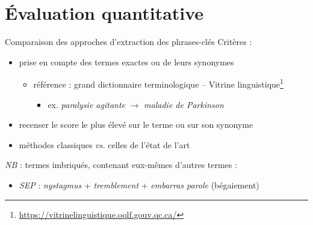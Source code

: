 \documentclass[xcolor={table,usenames,dvipsnames}]{beamer}
\let\olditem\item
\renewcommand{\item}{%
\olditem\vspace{0pt}}
\begin{document}
\section[Évaluation quantitative]{Évaluation quantitative}
\begin{frame}{Comparaison des approches d'extraction des phrases-clés}
	Critères :
	\begin{itemize}
		\item prise en compte des termes exactes ou de leurs synonymes
		\begin{itemize}
			\item référence : grand dictionnaire terminologique -- Vitrine linguistique\footnote{\url{https://vitrinelinguistique.oqlf.gouv.qc.ca/}}
				\begin{itemize}
					\item ex. \textit{paralysie agitante} $\rightarrow$ \textit{maladie de Parkinson}
				\end{itemize}
		\end{itemize}
					\item recenser le score le plus élevé sur le terme ou sur son synonyme
					\item méthodes classiques \textit{vs.} celles de l'état de l'art
	\end{itemize}
	
	\textit{NB} : termes \og{}imbriqués\fg{}, contenant eux-mêmes d'autres termes :
	\begin{itemize}
		\item \textit{SEP} : \textit{nystagmus} + \textit{tremblement} + \textit{embarras parole} (bégaiement)
	\end{itemize}
	\end{frame}
	
\end{document}
